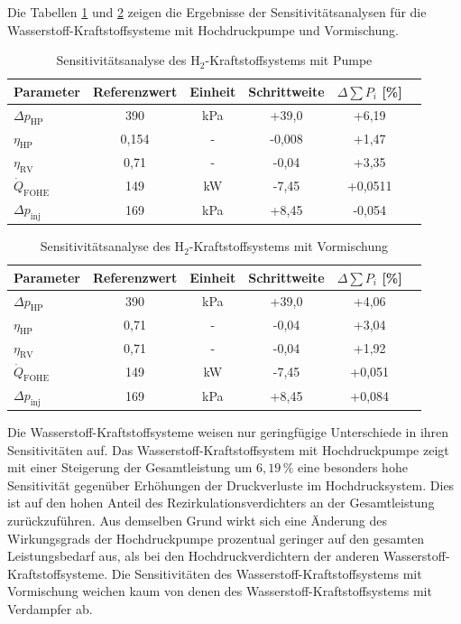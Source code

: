 Die Tabellen \ref{Tab:senspump} und \ref{Tab:sensdual} zeigen die Ergebnisse der Sensitivitätsanalysen für die Wasserstoff-Kraftstoffsysteme mit Hochdruckpumpe und Vormischung.

\begin{table}[ht]
	\centering
	\caption{Sensitivitätsanalyse des H$_2$-Kraftstoffsystems mit Pumpe}
	\begin{tabular} {|l|c|c|c|c|c|} \hline%
		Parameter & Referenzwert & Einheit & Schrittweite & $ \Delta \sum P_i$ [\%] \\ \hline\hline%
		$\Delta p_\mathrm{HP}$ & 390 & \si{\kilo\Pa} & +39,0 & +6,19 \\ \hline 
		$\eta_\mathrm{HP}$ & 0,154 & - & -0,008 & +1,47 \\ \hline 
		$\eta_\mathrm{RV}$ & 0,71 & - & -0,04 & +3,35 \\ \hline 
		$\dot{Q}_\mathrm{FOHE}$ & 149 & \si{\kilo\W} & -7,45 & +0,0511 \\ \hline 
		$\Delta p_\mathrm{inj}$ & 169 & \si{\kilo\Pa} & +8,45 & -0,054 \\ \hline 
	\end{tabular}	
	\label{Tab:senspump}%
\end{table}
\FloatBarrier 

\begin{table}[ht]
	\centering
	\caption{Sensitivitätsanalyse des H$_2$-Kraftstoffsystems mit Vormischung}
	\begin{tabular} {|l|c|c|c|c|c|} \hline%
		Parameter & Referenzwert & Einheit & Schrittweite & $ \Delta \sum P_i$ [\%] \\ \hline\hline%
		$\Delta p_\mathrm{HP}$ & 390 & \si{\kilo\Pa} & +39,0 & +4,06 \\ \hline 
		$\eta_\mathrm{HP}$ & 0,71 & - & -0,04 & +3,04 \\ \hline 
		$\eta_\mathrm{RV}$ & 0,71 & - & -0,04 & +1,92 \\ \hline 
		$\dot{Q}_\mathrm{FOHE}$ & 149 & \si{\kilo\W} & -7,45 & +0,051 \\ \hline 
		$\Delta p_\mathrm{inj}$ & 169 & \si{\kilo\Pa} & +8,45 & +0,084 \\ \hline 
	\end{tabular}	
	\label{Tab:sensdual}%
\end{table}
\FloatBarrier 

Die Wasserstoff-Kraftstoffsysteme weisen nur geringfügige Unterschiede in ihren Sensitivitäten auf. Das Wasserstoff-Kraftstoffsystem mit Hochdruckpumpe zeigt mit einer Steigerung der Gesamtleistung um $6,19\,\%$ eine besonders hohe Sensitivität gegenüber Erhöhungen der Druckverluste im Hochdrucksystem. Dies ist auf den hohen Anteil des Rezirkulationsverdichters an der Gesamtleistung zurückzuführen. Aus demselben Grund wirkt sich eine Änderung des Wirkungsgrads der Hochdruckpumpe prozentual geringer auf den gesamten Leistungsbedarf aus, als bei den Hochdruckverdichtern der anderen Wasserstoff-Kraftstoffsysteme. Die Sensitivitäten des Wasserstoff-Kraftstoffsystems mit Vormischung weichen kaum von denen des Wasserstoff-Kraftstoffsystems mit Verdampfer ab.

